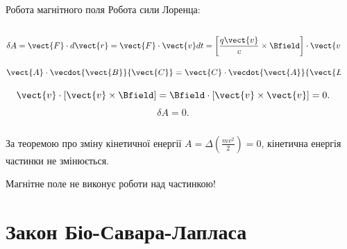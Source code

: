\documentclass{beamer}
\begin{document}
\begin{frame}{Робота магнітного поля}{}
	Робота сили Лоренца:
	\begin{columns}
		\begin{column}{0.65\linewidth}
			\begin{equation*}
				\delta A = \vect{F}\cdot d\vect{r} = \vect{F}\cdot\vect{v}dt = \left[\frac{q \vect{v}}{c}\times\Bfield\right] \cdot\vect{v}dt.
			\end{equation*}
			\begin{block}{}
				\begin{equation*}
					\vect{A}\cdot\vecdot{\vect{B}}{\vect{C}} = \vect{C}\cdot\vecdot{\vect{A}}{\vect{B}}.
				\end{equation*}
			\end{block}
			\begin{equation*}
				\vect{v}\cdot\left[\vect{v}\times\Bfield\right] = \Bfield\cdot\left[\vect{v}\times\vect{v}\right] = 0.
			\end{equation*}
			\begin{equation*}
				\delta A = 0.
			\end{equation*}
		\end{column}
		\begin{column}{0.35\linewidth}\centering
			
		\end{column}
	\end{columns}
	\begin{block}{}
		За теоремою про зміну кінетичної енергії $A = \Delta\left(\frac{mv^2}{2}\right) = 0$, кінетична енергія частинки не змінюється.
	\end{block}
	\begin{alertblock}{}\centering
		Магнітне поле не виконує роботи над частинкою!
	\end{alertblock}
\end{frame}



\section{Закон Біо-Савара-Лапласа}
\end{document}
